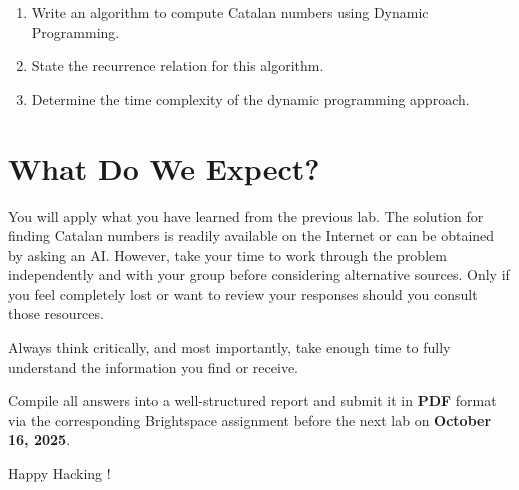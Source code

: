 \documentclass[12pt]{article}
\begin{document}
\begin{tcolorbox}[title=Exercises]
    \begin{enumerate}
        \item Write an algorithm to compute Catalan numbers using Dynamic Programming.
        \item State the recurrence relation for this algorithm.
        \item Determine the time complexity of the dynamic programming approach.
    \end{enumerate}
\end{tcolorbox}

\section{What Do We Expect?}

You will apply what you have learned from the previous lab. The solution for finding Catalan numbers is readily available on the Internet or can be obtained by asking an AI. However, take your time to work through the problem independently and with your group before considering alternative sources. Only if you feel completely lost or want to review your responses should you consult those resources.

Always think critically, and most importantly, take enough time to fully understand the information you find or receive.

Compile all answers into a well-structured report and submit it in \textbf{PDF} format via the corresponding Brightspace assignment before the next lab on \textbf{October 16, 2025}.

\vspace{5mm}
Happy Hacking !
\end{document}
